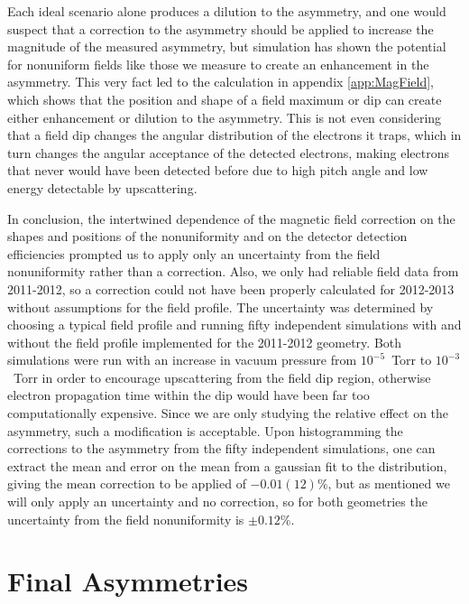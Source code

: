 Each ideal scenario alone produces a dilution to the asymmetry, and one would suspect that a
correction to the asymmetry should be applied to increase the magnitude of the measured asymmetry,
but simulation has shown the potential for nonuniform fields like those we measure to create an
enhancement in the asymmetry. This very fact led to the calculation in appendix \ref{app:MagField},
which shows that the position and shape of a field maximum or dip can create either
enhancement or dilution to the asymmetry. This is not even considering that a field dip changes
the angular distribution of the electrons it traps, which in turn changes the angular
acceptance of the detected electrons, making electrons that never would have been detected before
due to high pitch angle and low energy detectable by upscattering.

In conclusion, the intertwined dependence of the magnetic field correction on the shapes and
positions of the nonuniformity and on the detector detection efficiencies prompted us to apply
only an uncertainty from the field nonuniformity rather than a correction. Also, we only had
reliable field data from 2011-2012, so a correction could not have been properly calculated for
2012-2013 without assumptions for the field profile. The uncertainty was
determined by choosing a typical field profile and running fifty independent simulations with and
without the field profile implemented for the 2011-2012 geometry.
Both simulations were run with an increase in vacuum
pressure from $10^{-5}$~Torr to $10^{-3}$~Torr in order to encourage upscattering from the
field dip region, otherwise electron propagation time within the dip would have been far
too computationally expensive. Since we are only studying the relative effect on the asymmetry,
such a modification is acceptable. Upon histogramming the corrections to the asymmetry from
the fifty independent simulations, one can extract the mean and error on the mean from a gaussian
fit to the distribution, giving the mean correction to be applied of $-0.01(12)\%$, but as mentioned
we will only apply an uncertainty and no correction, so for both geometries the uncertainty from
the field nonuniformity is $\pm0.12\%$.






\section{Final Asymmetries}


